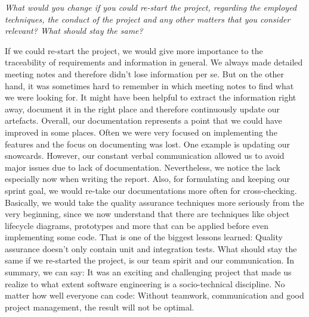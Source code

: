 \emph{What would you change if you could re-start the project, regarding the employed techniques,
    the conduct of the project and any other matters that you consider relevant?  What should stay the same?}

If we could re-start the project, we would give more importance to the traceability of requirements and information in general.
We always made detailed meeting notes and therefore didn't lose information per se.
But on the other hand, it was sometimes hard to remember in which meeting notes to find what we were looking for.
It might have been helpful to extract the information right away, document it in the right place and therefore continuously update our artefacts.
Overall, our documentation represents a point that we could have improved in some places.
Often we were very focused on implementing the features and the focus on documenting was lost.
One example is updating our snowcards.
However, our constant verbal communication allowed us to avoid major issues due to lack of documentation.
Nevertheless, we notice the lack especially now when writing the report.
Also, for formulating and keeping our sprint goal, we would re-take our documentations more often for cross-checking.
Basically, we would take the quality assurance techniques more seriously from the very beginning, since we now understand that there are techniques like object lifecycle diagrams, prototypes and more that can be applied before even implementing some code.
That is one of the biggest lessons learned: Quality assurance doesn't only contain unit and integration tests.
What should stay the same if we re-started the project, is our team spirit and our communication.
In summary, we can say: It was an exciting and challenging project that made us realize to what extent software engineering is a socio-technical discipline.
No matter how well everyone can code: Without teamwork, communication and good project management, the result will not be optimal.